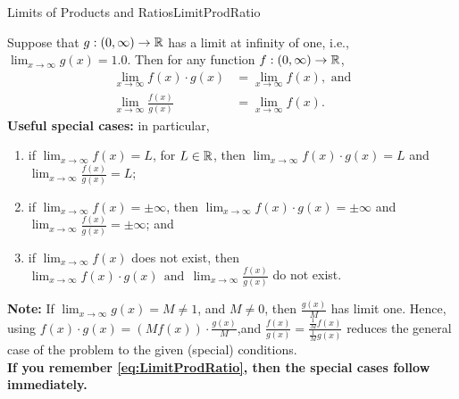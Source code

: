 \begin{propColor}{Limits of Products and Ratios}{LimitProdRatio}

Suppose that $g:(0, \infty) \to \mathbb R$ has a limit at infinity of one, i.e.,  $\displaystyle \lim_{x \to \infty} g(x) = 1.0$. Then for any function $f:(0, \infty) \to \mathbb R$,
\begin{equation}
\label{eq:LimitProdRatio}
    \begin{aligned}
        \lim_{x \to \infty} f(x) \cdot g(x) &= \lim_{x \to \infty} f(x), \text{ and} \\
         \lim_{x \to \infty} \frac{f(x)}{g(x)}& = \lim_{x \to \infty} f(x).
    \end{aligned}    
\end{equation}
\textbf{Useful special cases:} in particular, 
\begin{enumerate}
\renewcommand{\labelenumi}{(\alph{enumi})}
\setlength{\itemsep}{.2cm}
     \item if $\displaystyle \lim_{x \to \infty} f(x)= L$, for $L \in \mathbb R$, then $\displaystyle \lim_{x \to \infty} f(x) \cdot g(x) = L$ and $ \displaystyle \lim_{x \to \infty} \frac{f(x)}{g(x)}=L$; 
     \item if $\displaystyle \lim_{x \to \infty} f(x)=  \pm \infty$, then $\displaystyle \lim_{x \to \infty} f(x) \cdot g(x) = \pm \infty$ and $\displaystyle \lim_{x \to \infty} \frac{f(x)}{g(x)}= \pm \infty$; and
      \item if $\displaystyle \lim_{x \to \infty} f(x)$ does not exist, then $\displaystyle \lim_{x \to \infty} f(x) \cdot g(x)~~ \text{and}~~ \displaystyle \lim_{x \to \infty} \frac{f(x)}{g(x)}$ do not exist.   
\end{enumerate} 

\textbf{Note:} If $\displaystyle \lim_{x \to \infty} g(x) = M  \neq 1$, and $M \ne 0$, then $\frac{g(x)}{M}$ has limit one. Hence, using $f(x) \cdot g(x) = (M f(x)) \cdot\frac{g(x)}{M}$,and $\frac{f(x)}{g(x)} = \frac{\frac{1}{M}f(x)}{\frac{1}{M} g(x)}$ reduces the general case of the problem to the given (special) conditions.\\

\textbf{If you remember \eqref{eq:LimitProdRatio}, then the special cases follow immediately.} 
\end{propColor}

\bigskip

